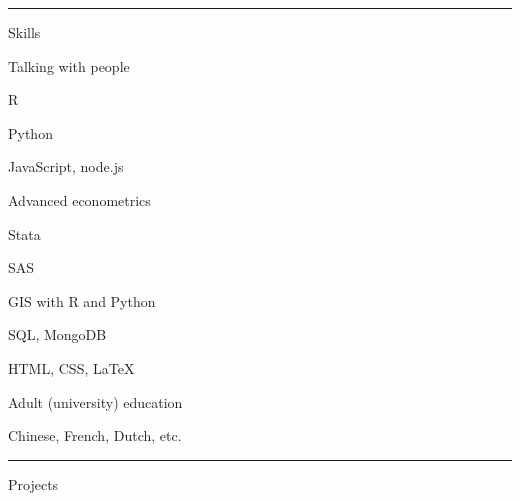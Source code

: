 \documentclass[letterpaper, english, 11pt]{article}
\newenvironment{packed_itemize}{
	\begin{itemize}
		\setlength{\itemsep}{1pt}
		\setlength{\parskip}{2pt}
		\setlength{\parsep}{2pt}
	} {\end{itemize}
}
\begin{document}
\hrule
 
Skills

\begin{footnotesize}
\begin{multicols}{3}
	\begin{packed_itemize}
		\item{Talking with people}
		\item R
		\item Python
		\item JavaScript, node.js
		\item Advanced econometrics
		\item Stata
		\item SAS
		\item GIS with R and Python
		\item SQL, MongoDB
		\item HTML, CSS, \LaTeX
		\item Adult (university) education
		\item Chinese, French, Dutch, etc.
	\end{packed_itemize}
\end{multicols}
\end{footnotesize}
\vspace{2pt}
\hrule

Projects
\end{document}
